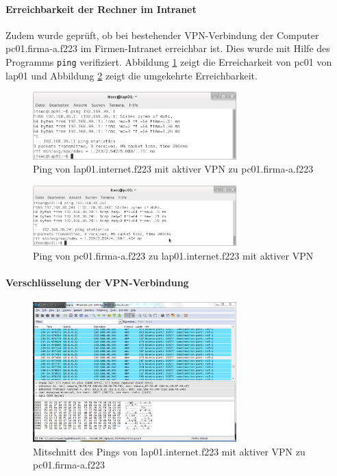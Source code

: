 \paragraph{Erreichbarkeit der Rechner im Intranet}
Zudem wurde geprüft, ob bei bestehender VPN-Verbindung der Computer pc01.firma-a.f223 im Firmen-Intranet erreichbar ist. Dies wurde mit Hilfe des Programms \texttt{ping} verifiziert. Abbildung \ref{vpn:lap01-ping-pc01} zeigt die Erreicharkeit von pc01 von lap01 und Abbildung \ref{vpn:pc01-ping-lap01} zeigt die umgekehrte Erreichbarkeit.

\begin{figure}[h!]
  \centering
    \includegraphics[width=0.7\textwidth]{figures/vpn_lap01_ping_pc01.png}
  \caption{Ping von lap01.internet.f223 mit aktiver VPN zu pc01.firma-a.f223}
  \label{vpn:lap01-ping-pc01}
\end{figure}

\begin{figure}[h!]
  \centering
    \includegraphics[width=0.7\textwidth]{figures/vpn_pc01_ping_lap01.png}
  \caption{Ping von pc01.firma-a.f223 zu lap01.internet.f223 mit aktiver VPN}
  \label{vpn:pc01-ping-lap01}
\end{figure}

\paragraph{Verschlüsselung der VPN-Verbindung}

\begin{figure}[h!]
  \centering
    \includegraphics[width=0.7\textwidth]{figures/vpn_ws_lap01_ping_pc01.png}
  \caption{Mitschnitt des Pings von lap01.internet.f223 mit aktiver VPN zu pc01.firma-a.f223}
  \label{vpn:ws_lap01-ping-pc01}
\end{figure}


